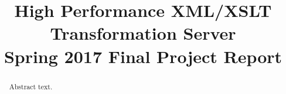 


\title{
	High Performance XML/XSLT Transformation Server \\
    {
    	\Large Spring 2017 Final Project Report
    }
}
\author{
}



\maketitle
\begin{abstract}
  Abstract text.
\end{abstract}

\tableofcontents

























